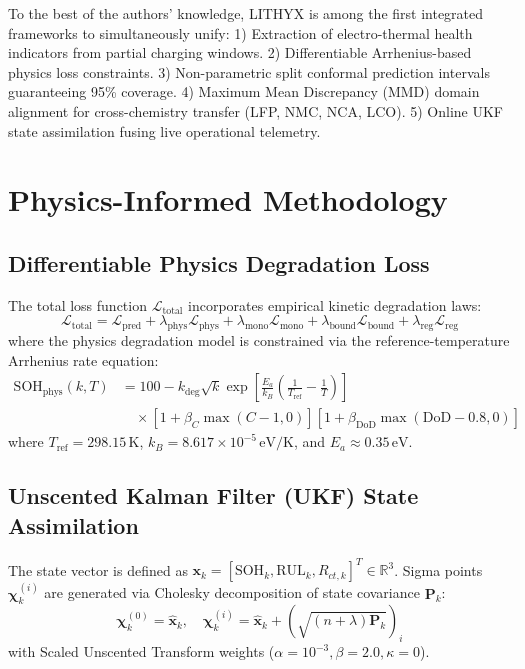 \documentclass[journal]{IEEEtran}
\begin{document}
To the best of the authors' knowledge, LITHYX is among the first integrated frameworks to simultaneously unify:
1) Extraction of electro-thermal health indicators from partial charging windows.
2) Differentiable Arrhenius-based physics loss constraints.
3) Non-parametric split conformal prediction intervals guaranteeing 95\% coverage.
4) Maximum Mean Discrepancy (MMD) domain alignment for cross-chemistry transfer (LFP, NMC, NCA, LCO).
5) Online UKF state assimilation fusing live operational telemetry.

\section{Physics-Informed Methodology}

\subsection{Differentiable Physics Degradation Loss}
The total loss function $\mathcal{L}_{\text{total}}$ incorporates empirical kinetic degradation laws:
\begin{equation}
\mathcal{L}_{\text{total}} = \mathcal{L}_{\text{pred}} + \lambda_{\text{phys}} \mathcal{L}_{\text{phys}} + \lambda_{\text{mono}} \mathcal{L}_{\text{mono}} + \lambda_{\text{bound}} \mathcal{L}_{\text{bound}} + \lambda_{\text{reg}} \mathcal{L}_{\text{reg}}
\end{equation}
where the physics degradation model is constrained via the reference-temperature Arrhenius rate equation:
\begin{align}
\text{SOH}_{\text{phys}}(k, T) &= 100 - k_{\text{deg}} \sqrt{k} \exp\left[ \frac{E_a}{k_B} \left( \frac{1}{T_{\text{ref}}} - \frac{1}{T} \right) \right] \nonumber \\
&\quad \times \left[ 1 + \beta_{C} \max(C - 1, 0) \right] \left[ 1 + \beta_{\text{DoD}} \max(\text{DoD} - 0.8, 0) \right]
\end{align}
where $T_{\text{ref}} = 298.15\,\text{K}$, $k_B = 8.617 \times 10^{-5}\,\text{eV/K}$, and $E_a \approx 0.35\,\text{eV}$.

\subsection{Unscented Kalman Filter (UKF) State Assimilation}
The state vector is defined as $\mathbf{x}_k = [\text{SOH}_k, \text{RUL}_k, R_{ct,k}]^T \in \mathbb{R}^3$. Sigma points $\boldsymbol{\chi}_k^{(i)}$ are generated via Cholesky decomposition of state covariance $\mathbf{P}_k$:
\begin{equation}
\boldsymbol{\chi}_k^{(0)} = \hat{\mathbf{x}}_k, \quad \boldsymbol{\chi}_k^{(i)} = \hat{\mathbf{x}}_k + \left( \sqrt{(n + \lambda) \mathbf{P}_k} \right)_i
\end{equation}
with Scaled Unscented Transform weights ($\alpha = 10^{-3}, \beta = 2.0, \kappa = 0$).
\end{document}
